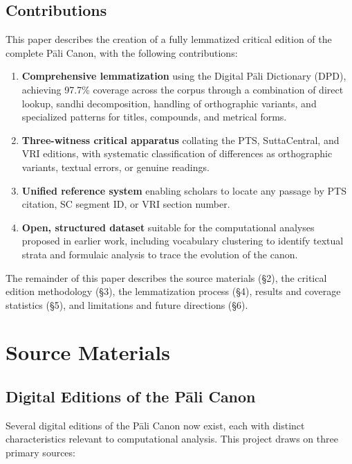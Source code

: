 \documentclass[unnumsec,webpdf,contemporary,large]{oup-authoring-template}
\begin{document}
\subsection{Contributions}

This paper describes the creation of a fully lemmatized critical edition of the complete Pāli Canon, with the following contributions:

\begin{enumerate}
\item \textbf{Comprehensive lemmatization} using the Digital Pāli Dictionary (DPD), achieving 97.7\% coverage across the corpus through a combination of direct lookup, sandhi decomposition, handling of orthographic variants, and specialized patterns for titles, compounds, and metrical forms.

\item \textbf{Three-witness critical apparatus} collating the PTS, SuttaCentral, and VRI editions, with systematic classification of differences as orthographic variants, textual errors, or genuine readings.

\item \textbf{Unified reference system} enabling scholars to locate any passage by PTS citation, SC segment ID, or VRI section number.

\item \textbf{Open, structured dataset} suitable for the computational analyses proposed in earlier work, including vocabulary clustering to identify textual strata and formulaic analysis to trace the evolution of the canon.
\end{enumerate}

The remainder of this paper describes the source materials (§2), the critical edition methodology (§3), the lemmatization process (§4), results and coverage statistics (§5), and limitations and future directions (§6).

\section{Source Materials}

\subsection{Digital Editions of the Pāli Canon}

Several digital editions of the Pāli Canon now exist, each with distinct characteristics relevant to computational analysis. This project draws on three primary sources:
\end{document}
